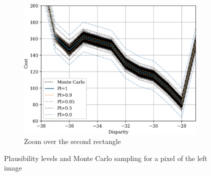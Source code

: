 \begin{figure}
\begin{subfigure}{0.45\linewidth}
        \includegraphics[width=\linewidth]{Images/Chap_4/cost_curve_100_120_zoom2.png}
        \caption{Zoom over the second rectangle}
        \label{fig:montecarlo_gauss_100_120_zoom2}
    \end{subfigure}
    \caption{Plausibility levels and Monte Carlo sampling for a pixel of the left image}
    \label{fig:montecarlo_gauss_100_120}
\end{figure}

